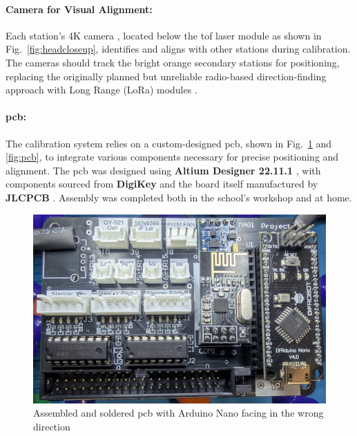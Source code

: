 \paragraph{Camera for Visual Alignment:}
Each station’s 4K camera \cite{armsom_camera_module}, located below the \acrshort{tof} laser module as shown in Fig.~\ref{fig:headcloseup}, identifies and aligns with other stations during calibration. The cameras should track the bright orange secondary stations for positioning, replacing the originally planned but unreliable radio-based direction-finding approach with Long Range (LoRa) modules \cite{tecnoio_lora_modules}.

\paragraph{\acrshort{pcb}:}
The calibration system relies on a custom-designed \acrshort{pcb}, shown in Fig.~\ref{fig:solderedpcb} and \ref{fig:pcb}, to integrate various components necessary for precise positioning and alignment. The \acrshort{pcb} was designed using \textbf{Altium Designer 22.11.1} \cite{altium_designer_22}, with components sourced from \textbf{DigiKey} \cite{digikey} and the board itself manufactured by \textbf{JLCPCB} \cite{jlcpcb}. Assembly was completed both in the school’s workshop and at home.

\begin{figure}[H]
	\centering
	\includegraphics[width=1.0\linewidth]{figures/soldered_pcb}
	\caption{Assembled and soldered \acrshort{pcb} with Arduino Nano \cite{arduino_nano_dfrobot} facing in the wrong direction}
	\label{fig:solderedpcb}
\end{figure}

